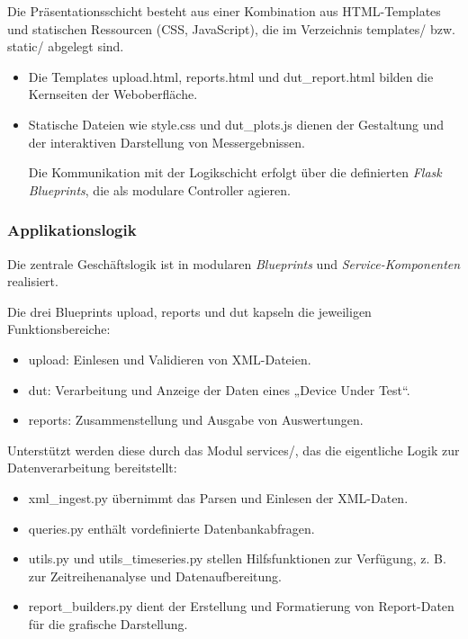 \begin{figure}[H]
\end{figure}

Die Präsentationsschicht besteht aus einer Kombination aus HTML-Templates und statischen Ressourcen (CSS, JavaScript), die im Verzeichnis templates/ bzw. static/ abgelegt sind.


\begin{itemize}

\item
Die Templates upload.html, reports.html und dut\_report.html bilden die Kernseiten der Weboberfläche.

\item
Statische Dateien wie style.css und dut\_plots.js dienen der Gestaltung und der interaktiven Darstellung von Messergebnissen.

Die Kommunikation mit der Logikschicht erfolgt über die definierten \textit{Flask Blueprints}, die als modulare Controller agieren.

\end{itemize}

\subsubsection*{Applikationslogik}

Die zentrale Geschäftslogik ist in modularen \textit{Blueprints} und \textit{Service-Komponenten} realisiert.

Die drei Blueprints upload, reports und dut kapseln die jeweiligen Funktionsbereiche:

\begin{itemize}

\item
upload: Einlesen und Validieren von XML-Dateien.

\item
dut: Verarbeitung und Anzeige der Daten eines „Device Under Test“.

\item
reports: Zusammenstellung und Ausgabe von Auswertungen.

\end{itemize}

Unterstützt werden diese durch das Modul services/, das die eigentliche Logik zur Datenverarbeitung bereitstellt:

\begin{itemize}

\item
xml\_ingest.py übernimmt das Parsen und Einlesen der XML-Daten.

\item
queries.py enthält vordefinierte Datenbankabfragen.

\item
utils.py und utils\_timeseries.py stellen Hilfsfunktionen zur Verfügung, z. B. zur Zeitreihenanalyse und Datenaufbereitung.

\item
report\_builders.py dient der Erstellung und Formatierung von Report-Daten für die grafische Darstellung.

\end{itemize}

